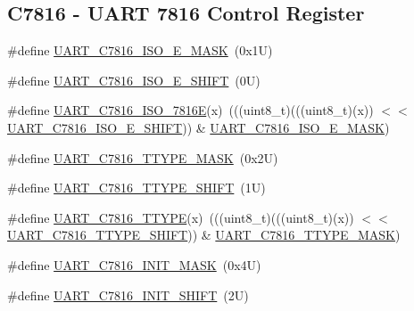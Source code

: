 \subsection*{C7816 -\/ U\+A\+RT 7816 Control Register}
\begin{DoxyCompactItemize}
\item 
\#define \mbox{\hyperlink{group___u_a_r_t___register___masks_gae34238a46464deaac39303c8b11431a2}{U\+A\+R\+T\+\_\+\+C7816\+\_\+\+I\+S\+O\+\_\+E\+\_\+\+M\+A\+SK}}~(0x1\+U)
\item 
\#define \mbox{\hyperlink{group___u_a_r_t___register___masks_gaee54546d1f78919cbcae5b7a5ec44f17}{U\+A\+R\+T\+\_\+\+C7816\+\_\+\+I\+S\+O\+\_\+E\+\_\+\+S\+H\+I\+FT}}~(0\+U)
\item 
\#define \mbox{\hyperlink{group___u_a_r_t___register___masks_ga66f91cf519df746474ee52bd1bf7e71a}{U\+A\+R\+T\+\_\+\+C7816\+\_\+\+I\+S\+O\+\_\+7816E}}(x)~(((uint8\+\_\+t)(((uint8\+\_\+t)(x)) $<$$<$ \mbox{\hyperlink{group___u_a_r_t___register___masks_gaee54546d1f78919cbcae5b7a5ec44f17}{U\+A\+R\+T\+\_\+\+C7816\+\_\+\+I\+S\+O\+\_\+E\+\_\+\+S\+H\+I\+FT}})) \& \mbox{\hyperlink{group___u_a_r_t___register___masks_gae34238a46464deaac39303c8b11431a2}{U\+A\+R\+T\+\_\+\+C7816\+\_\+\+I\+S\+O\+\_\+E\+\_\+\+M\+A\+SK}})
\item 
\#define \mbox{\hyperlink{group___u_a_r_t___register___masks_ga5c2601e69d81abd9d74da1eedefe0073}{U\+A\+R\+T\+\_\+\+C7816\+\_\+\+T\+T\+Y\+P\+E\+\_\+\+M\+A\+SK}}~(0x2\+U)
\item 
\#define \mbox{\hyperlink{group___u_a_r_t___register___masks_ga53eb4e563ed15c4c1e73d1fd15a77b2e}{U\+A\+R\+T\+\_\+\+C7816\+\_\+\+T\+T\+Y\+P\+E\+\_\+\+S\+H\+I\+FT}}~(1\+U)
\item 
\#define \mbox{\hyperlink{group___u_a_r_t___register___masks_gaf3a33b295da01f9685476c4c0b5f6350}{U\+A\+R\+T\+\_\+\+C7816\+\_\+\+T\+T\+Y\+PE}}(x)~(((uint8\+\_\+t)(((uint8\+\_\+t)(x)) $<$$<$ \mbox{\hyperlink{group___u_a_r_t___register___masks_ga53eb4e563ed15c4c1e73d1fd15a77b2e}{U\+A\+R\+T\+\_\+\+C7816\+\_\+\+T\+T\+Y\+P\+E\+\_\+\+S\+H\+I\+FT}})) \& \mbox{\hyperlink{group___u_a_r_t___register___masks_ga5c2601e69d81abd9d74da1eedefe0073}{U\+A\+R\+T\+\_\+\+C7816\+\_\+\+T\+T\+Y\+P\+E\+\_\+\+M\+A\+SK}})
\item 
\#define \mbox{\hyperlink{group___u_a_r_t___register___masks_ga52afeea9fbaec9489c45792a907b195b}{U\+A\+R\+T\+\_\+\+C7816\+\_\+\+I\+N\+I\+T\+\_\+\+M\+A\+SK}}~(0x4\+U)
\item 
\#define \mbox{\hyperlink{group___u_a_r_t___register___masks_ga7fe58f80db753fac78feefc4ab257d0d}{U\+A\+R\+T\+\_\+\+C7816\+\_\+\+I\+N\+I\+T\+\_\+\+S\+H\+I\+FT}}~(2\+U)

\end{DoxyCompactItemize}

